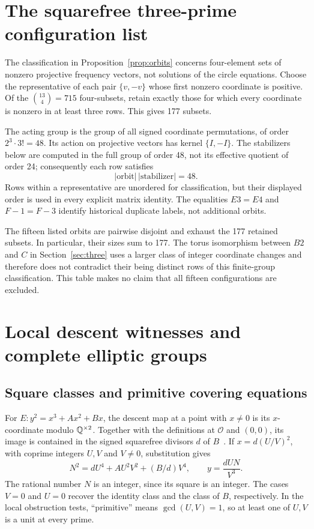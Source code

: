 \section{The squarefree three-prime configuration list}\label{app:orbits}
The classification in Proposition~\ref{prop:orbits} concerns four-element sets of nonzero projective frequency vectors, not solutions of the circle equations. Choose the representative of each pair $\{v,-v\}$ whose first nonzero coordinate is positive. Of the $\binom{13}{4}=715$ four-subsets, retain exactly those for which every coordinate is nonzero in at least three rows. This gives 177 subsets.

The acting group is the group of all signed coordinate permutations, of order $2^3\cdot3!=48$. Its action on projective vectors has kernel $\{I,-I\}$. The stabilizers below are computed in the full group of order 48, not its effective quotient of order 24; consequently each row satisfies
\[
 |\text{orbit}|\,|\text{stabilizer}|=48.
\]
Rows within a representative are unordered for classification, but their displayed order is used in every explicit matrix identity. The equalities $E3=E4$ and $F{-}1=F{-}3$ identify historical duplicate labels, not additional orbits.



The fifteen listed orbits are pairwise disjoint and exhaust the 177 retained subsets. In particular, their sizes sum to 177. The torus isomorphism between $B2$ and $C$ in Section~\ref{sec:three} uses a larger class of integer coordinate changes and therefore does not contradict their being distinct rows of this finite-group classification. This table makes no claim that all fifteen configurations are excluded.

\section{Local descent witnesses and complete elliptic groups}\label{app:descent}
\subsection{Square classes and primitive covering equations}
For $E:y^2=x^3+Ax^2+Bx$, the descent map at a point with $x\ne0$ is its $x$-coordinate modulo $\mathbb Q^{\times2}$. Together with the definitions at $\mathcal O$ and $(0,0)$, its image is contained in the signed squarefree divisors $d$ of $B$~\cite{SilvermanTate,SageDescent}. If $x=d(U/V)^2$, with coprime integers $U,V$ and $V\ne0$, substitution gives
\[
 N^2=dU^4+A U^2V^2+(B/d)V^4,\qquad
 y=\frac{dUN}{V^3}.
\]
The rational number $N$ is an integer, since its square is an integer. The cases $V=0$ and $U=0$ recover the identity class and the class of $B$, respectively. In the local obstruction tests, ``primitive'' means $\gcd(U,V)=1$, so at least one of $U,V$ is a unit at every prime.

